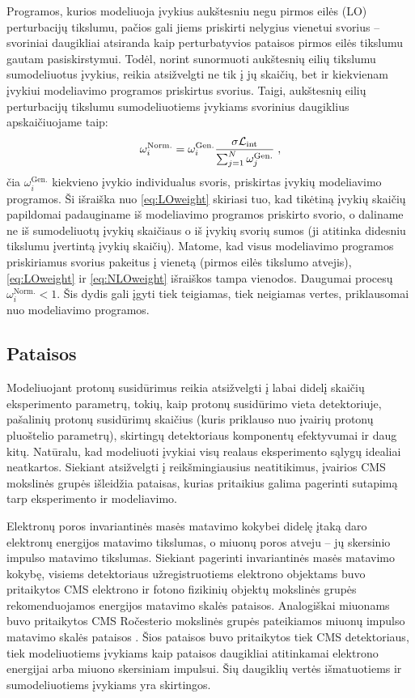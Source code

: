 \documentclass[a4paper, 12pt, oneside]{article}
\newcommand{\Lumi}{{\cal L}_\mathrm{int}}
\newlength\q
\begin{document}
Programos, kurios modeliuoja įvykius aukštesniu negu pirmos eilės (LO) perturbacijų tikslumu, pačios gali jiems priskirti
nelygius vienetui svorius -- svoriniai daugikliai atsiranda kaip perturbatyvios pataisos pirmos eilės tikslumu gautam
pasiskirstymui.
Todėl, norint sunormuoti aukštesnių eilių tikslumu sumodeliuotus įvykius, reikia atsižvelgti ne tik į jų skaičių, bet
ir kiekvienam įvykiui modeliavimo programos priskirtus svorius.
Taigi, aukštesnių eilių perturbacijų tikslumu sumodeliuotiems įvykiams svorinius daugiklius apskaičiuojame taip:
\begin{equation}
	\omega_{i}^{\mathrm{Norm.}} = \omega_{i}^{\mathrm{Gen.}} \frac{ \sigma\Lumi }{ \sum_{j=1}^{N}\omega_{j}^{\mathrm{Gen.}} } \; ,
	\label{eq:NLOweight}
\end{equation}
čia $\omega_{i}^{\mathrm{Gen.}}$ kiekvieno įvykio individualus svoris, priskirtas įvykių modeliavimo programos.
Ši išraiška nuo \eqref{eq:LOweight} skiriasi tuo, kad tikėtiną įvykių skaičių papildomai padauginame iš modeliavimo programos
priskirto svorio, o daliname ne iš sumodeliuotų įvykių skaičiaus o iš įvykių svorių sumos (ji atitinka didesniu tikslumu
įvertintą įvykių skaičių).
Matome, kad visus modeliavimo programos priskiriamus svorius pakeitus į vienetą (pirmos eilės tikslumo atvejis), \eqref{eq:LOweight}
ir \eqref{eq:NLOweight} išraiškos tampa vienodos.
Daugumai procesų $\omega_{i}^{\mathrm{Norm.}}<1$.
Šis dydis gali įgyti tiek teigiamas, tiek neigiamas vertes, priklausomai nuo modeliavimo programos.


\subsection{Pataisos}\label{sec:corrections}
Modeliuojant protonų susidūrimus reikia atsižvelgti į labai didelį skaičių eksperimento parametrų, tokių, kaip protonų
susidūrimo vieta detektoriuje, pašalinių protonų susidūrimų skaičius (kuris priklauso nuo įvairių protonų pluoštelio parametrų),
skirtingų detektoriaus komponentų efektyvumai ir daug kitų.
Natūralu, kad modeliuoti įvykiai visų realaus eksperimento sąlygų idealiai neatkartos.
Siekiant atsižvelgti į reikšmingiausius neatitikimus, įvairios CMS mokslinės grupės išleidžia pataisas, kurias
pritaikius galima pagerinti sutapimą tarp eksperimento ir modeliavimo.

Elektronų poros invariantinės masės matavimo kokybei didelę įtaką daro elektronų energijos matavimo tikslumas,
o miuonų poros atveju -- jų skersinio impulso matavimo tikslumas.
Siekiant pagerinti invariantinės masės matavimo kokybę, visiems detektoriaus užregistruotiems elektrono objektams
buvo pritaikytos CMS elektrono ir fotono fizikinių objektų mokslinės grupės rekomenduojamos energijos matavimo
skalės pataisos.
Analogiškai miuonams buvo pritaikytos CMS Ročesterio mokslinės grupės pateikiamos miuonų impulso matavimo skalės
pataisos \cite{RocCorr}.
Šios pataisos buvo pritaikytos tiek CMS detektoriaus, tiek modeliuotiems įvykiams kaip pataisos daugikliai atitinkamai
elektrono energijai arba miuono skersiniam impulsui.
Šių daugiklių vertės išmatuotiems ir sumodeliuotiems įvykiams yra skirtingos.
\end{document}
